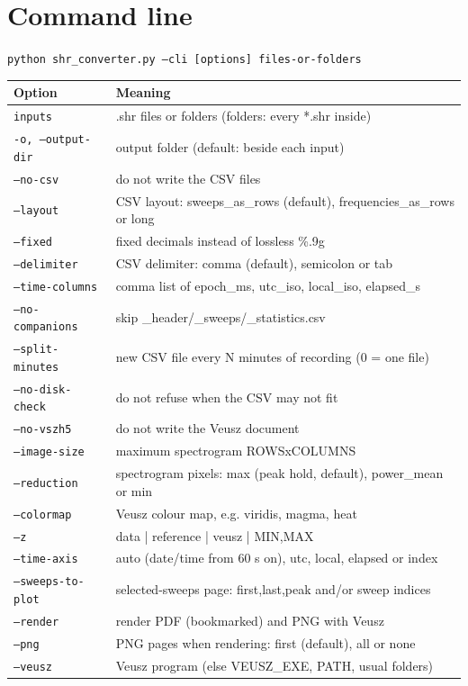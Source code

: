 \documentclass[11pt,a4paper]{article}
\newcommand{\code}[1]{\texttt{#1}}
\begin{document}
\section{Command line}
\code{python shr\_converter.py --cli [options] files-or-folders}
\begin{longtable}{p{4.6cm}p{11cm}}
\toprule
\textbf{Option} & \textbf{Meaning}\\
\midrule
\endhead
\texttt{inputs} & .shr files or folders (folders: every *.shr inside)\\
\texttt{-o, --output-dir} & output folder (default: beside each input)\\
\texttt{--no-csv} & do not write the CSV files\\
\texttt{--layout} & CSV layout: sweeps\_as\_rows (default), frequencies\_as\_rows or long\\
\texttt{--fixed} & fixed decimals instead of lossless \%.9g\\
\texttt{--delimiter} & CSV delimiter: comma (default), semicolon or tab\\
\texttt{--time-columns} & comma list of epoch\_ms, utc\_iso, local\_iso, elapsed\_s\\
\texttt{--no-companions} & skip \_header/\_sweeps/\_statistics.csv\\
\texttt{--split-minutes} & new CSV file every N minutes of recording (0 = one file)\\
\texttt{--no-disk-check} & do not refuse when the CSV may not fit\\
\texttt{--no-vszh5} & do not write the Veusz document\\
\texttt{--image-size} & maximum spectrogram ROWSxCOLUMNS\\
\texttt{--reduction} & spectrogram pixels: max (peak hold, default), power\_mean or min\\
\texttt{--colormap} & Veusz colour map, e.g. viridis, magma, heat\\
\texttt{--z} & data | reference | veusz | MIN,MAX\\
\texttt{--time-axis} & auto (date/time from 60 s on), utc, local, elapsed or index\\
\texttt{--sweeps-to-plot} & selected-sweeps page: first,last,peak and/or sweep indices\\
\texttt{--render} & render PDF (bookmarked) and PNG with Veusz\\
\texttt{--png} & PNG pages when rendering: first (default), all or none\\
\texttt{--veusz} & Veusz program (else VEUSZ\_EXE, PATH, usual folders)\\

\end{longtable}
\end{document}
